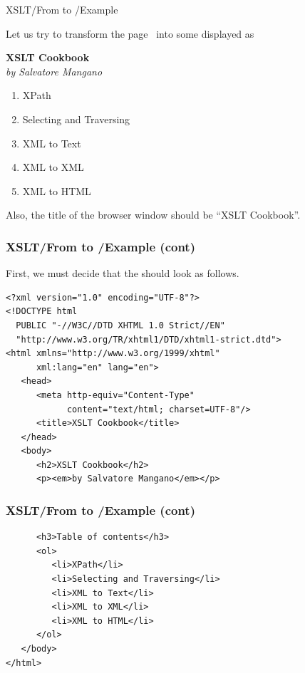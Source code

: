 %
\begin{frame}{XSLT/From \XML to \XHTML{}/Example}

Let us try to transform the \XML page~\pageref{cookbook.xml} into some
\XHTML displayed as

\bigskip

\textbf{XSLT Cookbook}\\
\emph{by Salvatore Mangano}
\begin{enumerate}

  \item XPath

  \item Selecting and Traversing

  \item XML to Text

  \item XML to XML

  \item XML to HTML

\end{enumerate}
Also, the title of the browser window should be ``XSLT Cookbook''.

\end{frame}

%
\begin{frame}[containsverbatim]
\frametitle{XSLT/From \XML to \XHTML{}/Example (cont)}

First, we must decide that the \XHTML should look as follows.
{\small
\begin{verbatim}
<?xml version="1.0" encoding="UTF-8"?>
<!DOCTYPE html
  PUBLIC "-//W3C//DTD XHTML 1.0 Strict//EN"
  "http://www.w3.org/TR/xhtml1/DTD/xhtml1-strict.dtd">
<html xmlns="http://www.w3.org/1999/xhtml"
      xml:lang="en" lang="en">
   <head>
      <meta http-equiv="Content-Type"
            content="text/html; charset=UTF-8"/>
      <title>XSLT Cookbook</title>
   </head>
   <body>
      <h2>XSLT Cookbook</h2>
      <p><em>by Salvatore Mangano</em></p>
\end{verbatim}
}

\end{frame}

%
\begin{frame}[containsverbatim]
\frametitle{XSLT/From \XML to \XHTML{}/Example (cont)}

{\small
\begin{verbatim}
      <h3>Table of contents</h3>
      <ol>
         <li>XPath</li>
         <li>Selecting and Traversing</li>
         <li>XML to Text</li>
         <li>XML to XML</li>
         <li>XML to HTML</li>
      </ol>
   </body>
</html>
\end{verbatim}
}

\end{frame}

